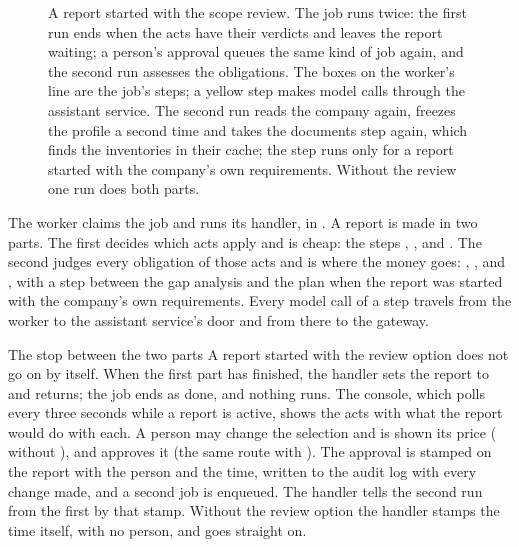 \begin{figure}[H]
\actorlegend
\caption{A report started with the scope review. The job runs twice: the first run ends when
  the acts have their verdicts and leaves the report waiting; a person's approval queues the
  same kind of job again, and the second run assesses the obligations. The boxes on the
  worker's line are the job's steps; a yellow step makes model calls through the assistant
  service. The second run reads the company again, freezes the profile a second time and
  takes the documents step again, which finds the inventories in
  their cache; the step  runs only for a report started with the company's own
  requirements. Without the review one run does both parts.}\label{fig:arch:report}
\end{figure}

The worker claims the job and runs its handler,  in .
A report is made in two parts. The first decides which acts apply and is cheap: the steps
, ,  and . The second
judges every obligation of those acts and is where the money goes: ,
,  and , with a step 
between the gap analysis and the plan when the report was started with the company's own
requirements. Every model call of a step travels from the worker to the assistant service's
door and from there to the gateway.

\begin{humanbox}{The stop between the two parts}
A report started with the review option does not go on by itself. When the first part has
finished, the handler sets the report to  and returns; the job ends as
done, and nothing runs. The console, which polls  every three
seconds while a report is active, shows the acts with what the report would do with each. A
person may change the selection and is shown its price (
without ), and approves it (the same route with ). The approval
is stamped on the report with the person and the time, written to the audit log with every
change made, and a second  job is enqueued. The handler tells the second
run from the first by that stamp. Without the review option the handler stamps the time
itself, with no person, and goes straight on.
\end{humanbox}


